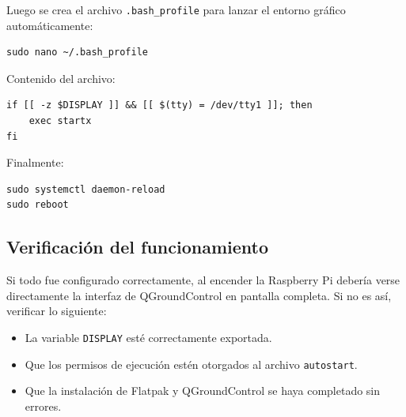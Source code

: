 \documentclass[12pt]{article}
\begin{document}
\noindent
Luego se crea el archivo \texttt{.bash\_profile} para lanzar el entorno gráfico automáticamente:

\begin{lstlisting}
sudo nano ~/.bash_profile
\end{lstlisting}

\noindent
Contenido del archivo:

\begin{lstlisting}
if [[ -z $DISPLAY ]] && [[ $(tty) = /dev/tty1 ]]; then
    exec startx
fi
\end{lstlisting}

Finalmente:

\begin{lstlisting}
sudo systemctl daemon-reload
sudo reboot
\end{lstlisting}

\subsection{Verificación del funcionamiento}
Si todo fue configurado correctamente, al encender la Raspberry Pi debería verse directamente la interfaz de QGroundControl en pantalla completa. Si no es así, verificar lo siguiente:

\begin{itemize}
    \item La variable \texttt{DISPLAY} esté correctamente exportada.
    \item Que los permisos de ejecución estén otorgados al archivo \texttt{autostart}.
    \item Que la instalación de Flatpak y QGroundControl se haya completado sin errores.
\end{itemize}
\end{document}
